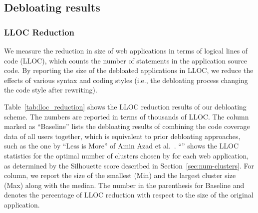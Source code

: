 \subsection{Debloating results}

\subsubsection{LLOC Reduction}
 
We measure the reduction in size of web applications in terms of logical lines of code (LLOC), which counts the number of statements in the application source code. 
By reporting the size of the debloated applications in LLOC, we reduce the effects of various syntax and coding styles (i.e., the debloating process changing the code style after rewriting). 

Table~\ref{tab:lloc_reduction} shows the LLOC reduction results of our debloating scheme. 
The numbers are reported in terms of thousands of LLOC. 
The column marked as ``Baseline'' lists the debloating results of combining the code coverage data of all users together, which is equivalent to prior debloating approaches, such as the one by ``Less is More'' of Amin Azad et al.~\cite{lessismore}.
``\dbltr{}'' shows the LLOC statistics for the optimal number of clusters chosen by \dbltr{} for each web application, as determined by the Silhouette score described in Section~\ref{sec:num-clusters}. 
For \dbltr{} column, we report the size of the smallest (Min) and the largest cluster size (Max) along with the median. 
The number in the parenthesis for Baseline and \dbltr{} denotes the percentage of LLOC reduction with respect to the size of the original application. 

